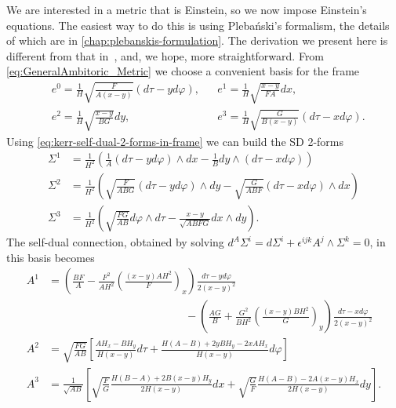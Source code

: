 \documentclass[10pt]{report}
\newcommand{\pleb}[0]{Pleba\'nski}
\theoremstyle{definition}
\begin{document}
We are interested in a metric that is Einstein, so we now impose Einstein's equations. 
The easiest way to do this is using \pleb{}'s formalism, the details of which are in \cref{chap:plebanskis-formulation}. The derivation we present here is different from that in~\cite{AmbitoricGeomeAposto2013}, and, we hope, more straightforward. From \cref{eq:GeneralAmbitoric_Metric} we choose a convenient basis for the frame 
\begin{equation}
\begin{aligned}
    &e^0 = \frac{1}{H}\sqrt{\frac{F}{A(x-y)}}(d\tau-yd\varphi), && e^1 = \frac{1}{H}\sqrt{\frac{x-y}{FA}}dx, \\  & e^2 = \frac{1}{H}\sqrt{\frac{x-y}{BG}}dy, && e^3 = \frac{1}{H}\sqrt{\frac{G}{B(x-y)}} (d\tau - x d\varphi).
\end{aligned}
\end{equation}
Using \cref{eq:kerr-self-dual-2-forms-in-frame} we can build the SD 2-forms
\begin{equation}
\begin{aligned}
    \Sigma^1 &= \frac{1}{H^2} \left( \frac{1}{A} (d\tau-yd\varphi) \wedge dx - \frac{1}{B} dy \wedge (d\tau-xd\varphi) \right) \\
    \Sigma^2 &= \frac{1}{H^2} \left( \sqrt{\frac{F}{ABG}} (d\tau-y d\varphi) \wedge dy - \sqrt{\frac{G}{ABF}} (d\tau-x d\varphi) \wedge dx \right) \\
    \Sigma^3 &= \frac{1}{H^2} \left( \sqrt{\frac{FG}{AB}} d\varphi\wedge d\tau - \frac{x-y}{\sqrt{ABFG}} dx \wedge dy \right).
\end{aligned}
\end{equation}
The self-dual connection, obtained by solving $d^A \Sigma^i = d\Sigma^i + \epsilon^{ijk} A^j \wedge \Sigma^k = 0$, in this basis becomes
\begin{align}
    A^1 &= \left( \frac{BF}{A} - \frac{F^2}{AH^2} \left( \frac{(x-y)AH^2}{F} \right)_x \right) \frac{d\tau-y d\varphi}{2(x-y)^2} \nonumber \\ & \hspace{150pt} - \left( \frac{AG}{B} + \frac{G^2}{BH^2} \left( \frac{(x-y)BH^2}{G} \right)_y \right) \frac{d\tau - x d\varphi}{2(x-y)^2} \nonumber\\
    A^2 &= \sqrt{\frac{FG}{AB}} \left[  \frac{A H_x - B H_y}{H(x-y)} d\tau + \frac{H(A-B) + 2yB H_y - 2xA H_x}{H(x-y)} d\varphi \right] \label{eq:AmbiToric_Connection_xy}\\
    A^3 &= \frac{1}{\sqrt{AB}} \left[ \sqrt{\frac{F}{G}} \frac{H(B-A) + 2B(x-y)H_y}{2H(x-y)} dx + \sqrt{\frac{G}{F}} \frac{H(A-B)-2A(x-y) H_x}{2H(x-y)} dy \right].\nonumber
\end{align}
\end{document}
